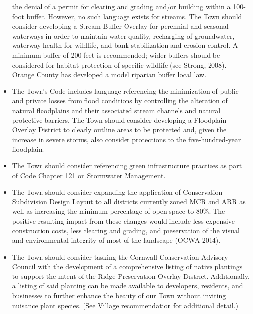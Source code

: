 \begin{itemize}
    the denial of a permit for clearing and grading and/or building within a 
    100-foot buffer. However, no such language exists for streams. The Town 
    should consider developing a Stream Buffer Overlay for perennial and 
    seasonal waterways in order to maintain water quality, recharging of 
    groundwater, waterway health for wildlife, and bank stabilization and 
    erosion control. A minimum buffer of 200 feet is recommended; wider buffers 
    should be considered for habitat protection of specific wildlife (see 
    Strong, 2008). Orange County has developed a model riparian buffer local 
    law.
    \item The Town’s Code includes language referencing the minimization of 
    public and private losses from flood conditions by controlling the 
    alteration of natural floodplains and their associated stream channels 
    and natural protective barriers.  The Town should consider developing a 
    Floodplain Overlay District to clearly outline areas to be protected 
    and, given the increase in severe storms, also consider protections to 
    the five-hundred-year floodplain.
    \item The Town should consider referencing green infrastructure practices 
    as part of Code Chapter 121 on Stormwater Management.
    \item The Town should consider expanding the application of Conservation 
    Subdivision Design Layout to all districts currently zoned MCR and ARR as 
    well as increasing the minimum percentage of open space to 80\%. The 
    positive resulting impact from these changes would include less expensive 
    construction costs, less clearing and grading, and preservation of the 
    visual and environmental integrity of most of the landscape (OCWA 2014).
    \item The Town should consider tasking the Cornwall Conservation Advisory 
    Council with the development of a comprehensive listing of native plantings 
    to support the intent of the Ridge Preservation Overlay District. 
    Additionally, a listing of said planting can be made available to 
    developers, residents, and businesses to further enhance the beauty of our 
    Town without inviting nuisance plant species. (See Village recommendation 
    for additional detail.)
\end{itemize}


